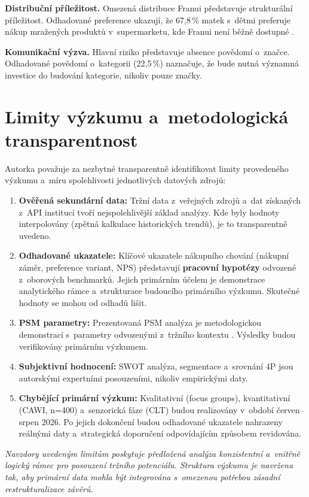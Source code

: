 \textbf{Distribuční příležitost.} Omezená distribuce Franui představuje strukturální příležitost. Odhadované preference ukazují, že 67,8\,\% matek s~dětmi preferuje nákup mražených produktů v~supermarketu, kde Franui není běžně dostupné \parencite{rohlik_franui_2026}.

\textbf{Komunikační výzva.} Hlavní riziko představuje absence povědomí o~značce. Odhadované povědomí o~kategorii (22,5\,\%) naznačuje, že bude nutná významná investice do budování kategorie, nikoliv pouze značky.

\section{Limity výzkumu a~metodologická transparentnost}
\label{sec:res_limits}

Autorka považuje za nezbytné transparentně identifikovat limity provedeného výzkumu a~míru spolehlivosti jednotlivých datových zdrojů:

\begin{enumerate}
  \item \textbf{Ověřená sekundární data:} Tržní data z~veřejných zdrojů \parencite{frozenfoodeurope_2025, czso_spotreba_2024, usda_fas_2025} a~dat získaných z~API institucí \parencite{cnb_kurzy_2026, worldbank_gdp_2026} tvoří nejspolehlivější základ analýzy. Kde byly hodnoty interpolovány (zpětná kalkulace historických trendů), je to transparentně uvedeno.

  \item \textbf{Odhadované ukazatele:} Klíčové ukazatele nákupního chování (nákupní záměr, preference variant, NPS) představují \textbf{pracovní hypotézy} odvozené z~oborových benchmarků. Jejich primárním účelem je demonstrace analytického rámce a~strukturace budoucího primárního výzkumu. Skutečné hodnoty se mohou od odhadů lišit.

  \item \textbf{PSM parametry:} Prezentovaná PSM analýza je metodologickou demonstrací s~parametry odvozenými z~tržního kontextu \parencite{vanwestendorp_1976}. Výsledky budou verifikovány primárním výzkumem.

  \item \textbf{Subjektivní hodnocení:} SWOT analýza, segmentace a~srovnání 4P jsou autorskými expertními posouzeními, nikoliv empirickými daty.

  \item \textbf{Chybějící primární výzkum:} Kvalitativní (focus groups), kvantitativní (CAWI, n=400) a~senzorická fáze (CLT) budou realizovány v~období červen--srpen 2026. Po jejich dokončení budou odhadované ukazatele nahrazeny reálnými daty a~strategická doporučení odpovídajícím způsobem revidována.
\end{enumerate}

\textit{Navzdory uvedeným limitům poskytuje předložená analýza konzistentní a~vnitřně logický rámec pro posouzení tržního potenciálu. Struktura výzkumu je navržena tak, aby primární data mohla být integrována s~omezenou potřebou zásadní restrukturalizace závěrů.}

